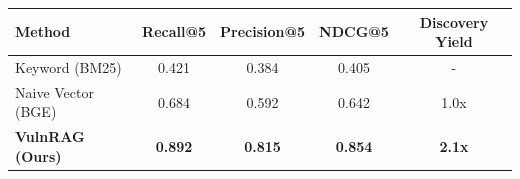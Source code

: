 \begin{tabular}{@{}lcccc@{}}
\toprule
\textbf{Method} & \textbf{Recall@5} & \textbf{Precision@5} & \textbf{NDCG@5} & \textbf{Discovery Yield} \\ \midrule
Keyword (BM25) & 0.421 & 0.384 & 0.405 & - \\
Naive Vector (BGE) & 0.684 & 0.592 & 0.642 & 1.0x \\
\textbf{VulnRAG (Ours)} & \textbf{0.892} & \textbf{0.815} & \textbf{0.854} & \textbf{2.1x} \\ \bottomrule
\end{tabular}
